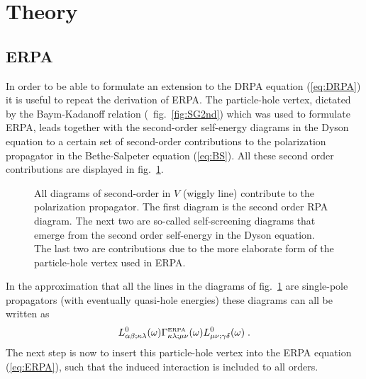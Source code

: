 \section{Theory\label{sect:DERPAtheory}}
\subsection{ERPA\label{sect:theoryERPA}}
In order to be able to formulate an extension to the DRPA equation 
(\ref{eq:DRPA}) it is useful to repeat the derivation of ERPA\cite{BAD90}.
The particle-hole vertex, dictated by the Baym-Kadanoff relation
(\cf\ fig.~\ref{fig:SG2nd}) 
which was used to formulate ERPA, leads together with the 
second-order self-energy diagrams in the Dyson equation to a certain set of 
second-order contributions to the polarization propagator in the 
Bethe-Salpeter equation (\ref{eq:BS}). All these second order contributions 
are displayed in fig.~\ref{fig:DERPAdiagrams}.
%
%
\begin{figure}
\centerline{
\hspace{25pt}
\hspace{25pt}
\hspace{25pt}
\hspace{25pt}
}
\caption[]{All diagrams of second-order in $V$ (wiggly line) contribute to
the polarization propagator. The first diagram is the second order RPA diagram.
The next two are so-called self-screening diagrams that emerge from the
second order self-energy in the Dyson equation. The last two are contributions
due to the more elaborate form of the particle-hole vertex used in ERPA.
\label{fig:DERPAdiagrams}}
\end{figure}

In the approximation that all the lines in the diagrams of 
fig.~\ref{fig:DERPAdiagrams} are single-pole propagators (with eventually 
quasi-hole energies) these diagrams can all be written as
%
	\begin{equation}
		L^0_{\alpha\beta;\kappa\lambda}(\omega)
		\Gamma^{\mbox{\tiny ERPA}}_{\kappa\lambda;\mu\nu}(\omega)
		L^0_{\mu\nu;\gamma\delta}(\omega)
	\;.
	\end{equation}
%
The next step is now to insert this particle-hole vertex
into the ERPA equation (\ref{eq:ERPA}), such that the induced interaction is 
included to all orders.

